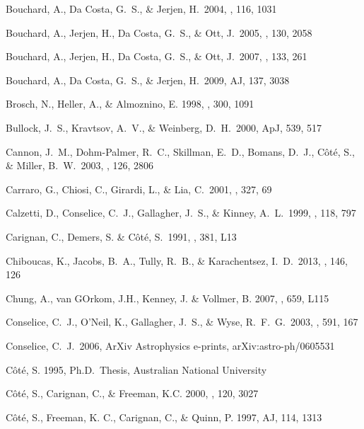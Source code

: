 \documentclass[12pt,onecolumn]{emulateapj}
\begin{document}
\begin{thebibliography}{}
Bouchard, A., Da Costa, G.~S., \& Jerjen, H.\ 2004, \pasp, 116, 1031 

Bouchard, A., Jerjen, H., Da Costa, G.~S., \& Ott, J.\ 2005, \aj, 130, 2058 

Bouchard, A., Jerjen, H., Da Costa, G.~S., \& Ott, J.\ 2007, \aj, 133, 261 

Bouchard, A., Da Costa, G.~S., \& Jerjen, H.\ 2009, AJ, 137, 3038

Brosch, N., Heller, A., \& Almoznino, E. 1998, \mnras , 300, 1091

Bullock, J.~S., Kravtsov, A.~V., \& Weinberg, D.~H.\ 2000, ApJ, 539, 517

Cannon, J.~M., Dohm-Palmer, R.~C., Skillman, E.~D., Bomans, D.~J., 
C{\^o}t{\'e}, S., \& Miller, B.~W.\ 2003, \aj, 126, 2806 

Carraro, G., Chiosi, C., Girardi, L., \& Lia, C.\ 2001, \mnras, 327, 69 

Calzetti, D., Conselice, C.~J., Gallagher, J.~S., \& Kinney, A.~L.\ 1999, \aj, 118, 797

Carignan, C., Demers, S. \& C\^ot\'e, S.\ 1991, \apj, 381, L13

Chiboucas, K., Jacobs, B.~A., Tully, R.~B., \& Karachentsez, I.~D.\ 2013, \aj, 146, 126
 
Chung, A., van GOrkom, J.H., Kenney, J. \& Vollmer, B. 2007, \apj, 659, L115 

Conselice, C.~J., O'Neil, K., Gallagher, J.~S., \& Wyse, R.~F.~G.\ 2003, \apj, 591, 167 

Conselice, C.~J.\ 2006, ArXiv Astrophysics e-prints, arXiv:astro-ph/0605531 

C\^ot\'e, S. 1995, Ph.D.\ Thesis, Australian National University

C\^ot\'e, S., Carignan, C., \& Freeman, K.C. 2000, \aj , 120, 3027

C\^ot\'e, S., Freeman, K. C., Carignan, C., \& Quinn, P. 1997, AJ, 114, 1313


\end{thebibliography}
\end{document}
